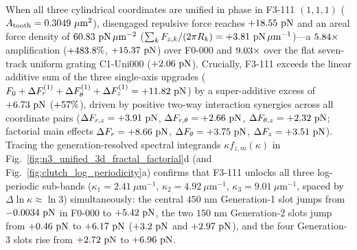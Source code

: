 \documentclass[pdflatex,sn-nature]{sn-jnl}
\DeclareRobustCommand{\roundone}[1]{\fpeval{round(#1,1)}}
\DeclareRobustCommand{\roundtwo}[1]{\fpeval{round(#1,2)}}
\DeclareRobustCommand{\roundfour}[1]{\fpeval{round(#1,4)}}
\begin{document}
When all three cylindrical coordinates are unified in phase in F3-111 $(1,1,1)$ ($A_{\rm tooth} = \roundfour{\NthreeUnithreedFoneoneoneUnifiedAreaUmtwo}\ \mu\text{m}^2$), disengaged repulsive force reaches $+\roundtwo{\NthreeUnithreedFoneoneoneUnifiedFzPn}\text{ pN}$ and an areal force density of $\roundtwo{\NthreeUnithreedFoneoneoneUnifiedFa}\text{ pN}\,\mu\text{m}^{-2}$ ($\sum_k F_{z,k}/(2\pi R_k) = +\roundtwo{\NthreeUnithreedFoneoneoneUnifiedFcirc}\text{ pN}\,\mu\text{m}^{-1}$)---a $\roundtwo{\NthreeUnithreedRatioFoneoneoneVsFzerozerozero}\times$ amplification ($+\roundone{\NthreeUnithreedGainFoneoneoneVsFzerozerozeroPct}\%$, $+\roundtwo{\NthreeUnithreedGainFoneoneoneVsFzerozerozeroPn}\text{ pN}$) over F0-000 and $\roundtwo{\NthreeUnithreedRatioFoneoneoneVsUnizerozerozero}\times$ over the flat seven-track uniform grating C1-Uni000 ($+\roundtwo{\NthreeUnithreedCtrlUnizerozerozeroFzPn}\text{ pN}$). Crucially, F3-111 exceeds the linear additive sum of the three single-axis upgrades ($F_0 + \Delta F_r^{(1)} + \Delta F_\theta^{(1)} + \Delta F_z^{(1)} = +\roundtwo{\NthreeUnithreedLinearAdditiveSumPn}\text{ pN}$) by a super-additive excess of $+\roundtwo{\NthreeUnithreedSuperadditiveExcessPn}\text{ pN}$ ($+\roundone{\NthreeUnithreedSuperadditiveExcessPct}\%$), driven by positive two-way interaction synergies across all coordinate pairs ($\Delta F_{r,z} = +\roundtwo{\NthreeUnithreedSynergyRZPn}\text{ pN}$, $\Delta F_{r,\theta} = +\roundtwo{\NthreeUnithreedSynergyRThetaPn}\text{ pN}$, $\Delta F_{\theta,z} = +\roundtwo{\NthreeUnithreedSynergyThetaZPn}\text{ pN}$; factorial main effects $\Delta F_r = +\roundtwo{\NthreeUnithreedMainEffectRPn}\text{ pN}$, $\Delta F_\theta = +\roundtwo{\NthreeUnithreedMainEffectThetaPn}\text{ pN}$, $\Delta F_z = +\roundtwo{\NthreeUnithreedMainEffectZPn}\text{ pN}$). Tracing the generation-resolved spectral integrands $\kappa f_{z,m}(\kappa)$ in Fig.~\ref{fig:n3_unified_3d_fractal_factorial}d (and Fig.~\ref{fig:clutch_log_periodicity}a) confirms that F3-111 unlocks all three log-periodic sub-bands ($\kappa_1 = 2.41\ \mu\text{m}^{-1}$, $\kappa_2 = 4.92\ \mu\text{m}^{-1}$, $\kappa_3 = 9.01\ \mu\text{m}^{-1}$, spaced by $\Delta\ln\kappa \approx \ln 3$) simultaneously: the central $450\text{ nm}$ Generation-1 slot jumps from $\roundfour{\NthreeUnithreedSlotfourFzerozerozeroPn}\text{ pN}$ in F0-000 to $+\roundtwo{\NthreeUnithreedSlotfourFoneoneonePn}\text{ pN}$, the two $150\text{ nm}$ Generation-2 slots jump from $+\roundtwo{\NthreeUnithreedGentwoFzerozerozeroPn}\text{ pN}$ to $+\roundtwo{\NthreeUnithreedGentwoFoneoneonePn}\text{ pN}$ ($+\roundtwo{\NthreeUnithreedSlottwoFoneoneonePn}\text{ pN}$ and $+\roundtwo{\NthreeUnithreedSlotsixFoneoneonePn}\text{ pN}$), and the four Generation-3 slots rise from $+\roundtwo{\NthreeUnithreedGenthreeFzerozerozeroPn}\text{ pN}$ to $+\roundtwo{\NthreeUnithreedGenthreeFoneoneonePn}\text{ pN}$.
\end{document}

